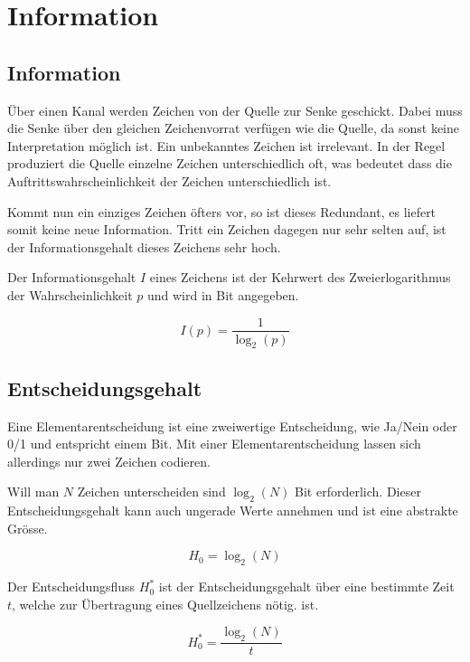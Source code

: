 \section{Information}

\subsection{Information}
 
Über einen Kanal werden Zeichen von der Quelle zur Senke geschickt. Dabei muss
die Senke über den gleichen Zeichenvorrat verfügen wie die Quelle, da sonst
keine Interpretation möglich ist. Ein unbekanntes Zeichen ist irrelevant. In der
Regel produziert die Quelle einzelne Zeichen unterschiedlich oft, was bedeutet
dass die Auftrittswahrscheinlichkeit der Zeichen unterschiedlich ist. 

Kommt nun ein einziges Zeichen öfters vor, so ist dieses Redundant, es liefert
somit keine neue Information. Tritt ein Zeichen dagegen nur sehr selten auf, ist
der Informationsgehalt dieses Zeichens sehr hoch. 

Der Informationsgehalt $I$ eines Zeichens ist der Kehrwert des Zweierlogarithmus
der Wahrscheinlichkeit $p$ und wird in Bit angegeben.

\begin{displaymath}
I(p)=\frac{1}{\log_2(p)}
\end{displaymath}


\subsection{Entscheidungsgehalt}

Eine Elementarentscheidung ist eine zweiwertige Entscheidung, wie Ja/Nein oder
0/1 und entspricht einem Bit. Mit einer Elementarentscheidung lassen sich
allerdings nur zwei Zeichen codieren. 

Will man $N$ Zeichen unterscheiden sind $\log_2(N)$ Bit erforderlich. Dieser
Entscheidungsgehalt kann auch ungerade Werte annehmen und ist eine abstrakte
Grösse.

\begin{displaymath}
H_0=\log_2(N)
\end{displaymath}

Der Entscheidungsfluss $H^*_0$ ist der Entscheidungsgehalt über eine bestimmte
Zeit $t$, welche zur Übertragung eines Quellzeichens nötig. ist.

\begin{displaymath}
H^*_0=\frac{\log_2(N)}{t}
\end{displaymath}


